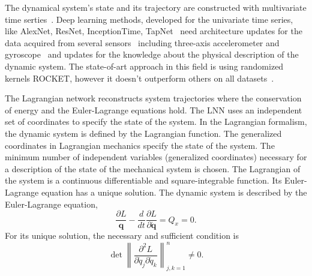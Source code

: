 \documentclass[sn-mathphys-num]{sn-jnl}
\theoremstyle{thmstylethree}
\theoremstyle{thmstyletwo}
\theoremstyle{thmstyleone}
\begin{document}
The dynamical system's state and its trajectory are constructed with multivariate time serties~\cite{TCSreview}. Deep learning methods, developed for the univariate time series, like AlexNet, ResNet, InceptionTime, TapNet~\cite{TCSreview}\cite{MTCSreview} need architecture updates for the data acquired from several sensors~\cite{MTCSindustrial} including three-axis accelerometer and gyroscope~\cite{MTCSactivity} and updates for the knowledge about the physical description of the dynamic system. The state-of-art approach in this field is using randomized kernels ROCKET, however it doesn't outperform others on all datasets~\cite{TCSreview}\cite{ROCKET}.

The Lagrangian network reconstructs system trajectories where the conservation of energy and the Euler-Lagrange equations hold. The LNN  uses an independent set of coordinates to specify the state of the system. In the Lagrangian formalism, the dynamic system is defined by the Lagrangian function.  The generalized coordinates in Lagrangian mechanics specify the state of the system. The minimum number of independent variables (generalized coordinates) necessary for a description of the state of the mechanical system is chosen. The Lagrangian of the system is a continuous differentiable and square-integrable function. Its Euler-Lagrange equation has a unique solution. 
The dynamic system is described by the Euler-Lagrange equation,
\begin{equation}
\frac{\partial L}{\mathbf{q}}-\frac{d}{dt}\frac{\partial L}{\partial\dot{\mathbf{q}}}=Q_x=0.
      \label{eq:euler_larange}
\end{equation}
For its unique solution, the necessary and sufficient condition is 
\begin{equation}
    \det \left \| \frac{\partial^{2} L}{\partial \dot{q}_{j}\partial \dot{q}_{k}} \right \|_{j,k=1}^{n} \neq 0.
\end{equation}
\begin{figure}
\centering
{}
\end{figure}
\end{document}

